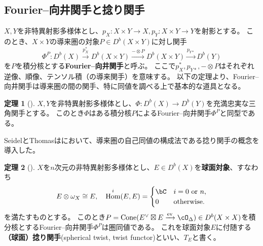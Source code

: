 \documentclass[uplatex,11pt,a4paper,dvipdfmx]{jsarticle}
\numberwithin{equation}{section}
\theoremstyle{definition}
\newtheorem{theorem}{定理}[section]
\newtheorem{remark}[theorem]{補足}
\DeclareMathOperator{\Hom}{\mathrm{Hom}}
\DeclareMathOperator{\Cone}{\mathrm{Cone}}
\DeclareMathOperator{\ev}{\mathrm{ev}}
\begin{document}
\subsection{Fourier--向井関手と捻り関手}
$X, Y$を非特異射影多様体とし、$p_X \colon X\times Y \to X, p_Y \colon X \times Y \to Y$を射影とする。
このとき、$X \times Y$の導来圏の対象$P \in D^b(X \times Y)$に対し関手
\begin{equation}
    \Phi^P \colon D^b(X) \xrightarrow{p_X^*} D^b(X \times Y) \xrightarrow{ - \otimes P} D^b(X \times Y) \xrightarrow{p_{Y*}} D^b(Y)
\end{equation}
を$P$を積分核とする\textbf{Fourier--向井関手}と呼ぶ。
ここで$p_X^*, p_{Y*}, - \otimes P$はそれぞれ逆像、順像、テンソル積（の導来関手）を意味する。
以下の定理より、Fourier--向井関手は導来圏の間の関手、特に同値を調べる上で基本的な道具となる。
\begin{theorem}[\cite{MR1465519}]
    $X, Y$を非特異射影多様体とし、$\Phi \colon D^b(X) \to D^b(Y)$を充満忠実な三角関手とする。
    このとき$\Phi$はある積分核$P$によるFourier--向井関手$\Phi^P$と同型である。
\end{theorem}
SeidelとThomasは\cite{MR1831820}において、導来圏の自己同値の構成法である捻り関手の概念を導入した。
\begin{theorem}[\cite{MR1831820}]
    $X$を$n$次元の非特異射影多様体とし、$E \in D^b(X)$を\textbf{球面対象}、すなわち\begin{equation}
        E \otimes \omega_X \cong E,\quad \Hom^i(E, E) = \begin{cases}
            \bC & i = \text{$0$ or $n$}, \\
            0   & \text{otherwise.}
        \end{cases}
    \end{equation}を満たすものとする。
    このとき$P = \Cone(E^\vee \boxtimes E \xrightarrow{\ev} \cO_\Delta) \in D^b(X \times X)$を積分核とするFourier--向井関手$\Phi^P$は圏同値である。
    これを球面対象$E$に付随する\textbf{（球面）捻り関手}(spherical twist, twist functor)といい、$T_E$と書く。
\end{theorem}
\end{document}
